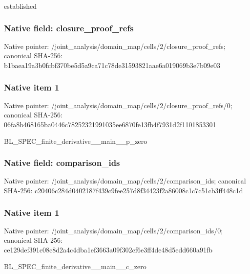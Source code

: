 \documentclass[10pt,a4paper]{article}
\begin{document}
\begingroup\raggedright\sloppy established\par\endgroup

\subsubsection{Native field: closure\_\allowbreak{}proof\_\allowbreak{}refs}
Native pointer: /joint\_\allowbreak{}analysis/domain\_\allowbreak{}map/cells/2/closure\_\allowbreak{}proof\_\allowbreak{}refs; canonical SHA-256: b1baea19a3b0fcbf370be5d5a9ca71c78de31593821aae6a019069b3e7b09e03

\subsubsection{Native item 1}
Native pointer: /joint\_\allowbreak{}analysis/domain\_\allowbreak{}map/cells/2/closure\_\allowbreak{}proof\_\allowbreak{}refs/0; canonical SHA-256: 06fa8b468165ba0446c78252321991035ee6870fe13fb4f7931d2f1101853301

\begingroup\raggedright\sloppy BL\_\allowbreak{}SPEC\_\allowbreak{}finite\_\allowbreak{}derivative\_\allowbreak{}\_\allowbreak{}main\_\allowbreak{}\_\allowbreak{}p\_\allowbreak{}zero\par\endgroup

\subsubsection{Native field: comparison\_\allowbreak{}ids}
Native pointer: /joint\_\allowbreak{}analysis/domain\_\allowbreak{}map/cells/2/comparison\_\allowbreak{}ids; canonical SHA-256: c20406c284d0402187f439c9fee257d8f34423f2a86008c1c7c51cb3ff448c1d

\subsubsection{Native item 1}
Native pointer: /joint\_\allowbreak{}analysis/domain\_\allowbreak{}map/cells/2/comparison\_\allowbreak{}ids/0; canonical SHA-256: ce129def391c08c8d2a4c4dba1ef3663a09f302cf6e3ff4de48d5edd660a91fb

\begingroup\raggedright\sloppy BL\_\allowbreak{}SPEC\_\allowbreak{}finite\_\allowbreak{}derivative\_\allowbreak{}\_\allowbreak{}main\_\allowbreak{}\_\allowbreak{}c\_\allowbreak{}zero\par\endgroup
\end{document}
